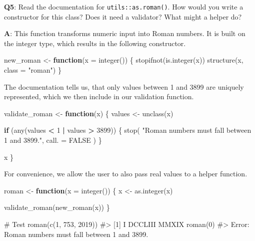 \documentclass[
]{krantz}
\makeatletter
\newenvironment{Shaded}{\begin{snugshade}}{\end{snugshade}}
\newcommand{\CommentTok}[1]{\textcolor[rgb]{0.56,0.35,0.01}{\textit{#1}}}
\newcommand{\ControlFlowTok}[1]{\textcolor[rgb]{0.13,0.29,0.53}{\textbf{#1}}}
\newcommand{\DataTypeTok}[1]{\textcolor[rgb]{0.13,0.29,0.53}{#1}}
\newcommand{\DecValTok}[1]{\textcolor[rgb]{0.00,0.00,0.81}{#1}}
\newcommand{\KeywordTok}[1]{\textcolor[rgb]{0.13,0.29,0.53}{\textbf{#1}}}
\newcommand{\NormalTok}[1]{#1}
\newcommand{\OperatorTok}[1]{\textcolor[rgb]{0.81,0.36,0.00}{\textbf{#1}}}
\newcommand{\OtherTok}[1]{\textcolor[rgb]{0.56,0.35,0.01}{#1}}
\newcommand{\StringTok}[1]{\textcolor[rgb]{0.31,0.60,0.02}{#1}}
\newenvironment{kframe}{%
\medskip{}
\setlength{\fboxsep}{.8em}
 \def\at@end@of@kframe{}%
 \ifinner\ifhmode%
  \def\at@end@of@kframe{\end{minipage}}%
  \begin{minipage}{\columnwidth}%
 \fi\fi%
 \def\FrameCommand##1{\hskip\@totalleftmargin \hskip-\fboxsep
 \colorbox{shadecolor}{##1}\hskip-\fboxsep
     \hskip-\linewidth \hskip-\@totalleftmargin \hskip\columnwidth}%
 \MakeFramed {\advance\hsize-\width
   \@totalleftmargin\z@ \linewidth\hsize
   \@setminipage}}%
 {\par\unskip\endMakeFramed%
 \at@end@of@kframe}
\renewenvironment{Shaded}{\begin{kframe}}{\end{kframe}}
\renewcommand{\KeywordTok} [1]{\textcolor[rgb]{0.00,0.44,0.13}{{#1}}}
\renewcommand{\DataTypeTok}[1]{\textcolor[rgb]{0.56,0.13,0.00}{{#1}}}
\renewcommand{\DecValTok}  [1]{\textcolor[rgb]{0.25,0.63,0.44}{{#1}}}
\renewcommand{\StringTok}  [1]{\textcolor[rgb]{0.25,0.44,0.63}{{#1}}}
\renewcommand{\CommentTok} [1]{\textcolor[rgb]{0.38,0.63,0.69}{{#1}}}
\renewcommand{\OtherTok}   [1]{\textcolor[rgb]{0.00,0.44,0.13}{{#1}}}
\renewcommand{\NormalTok}  [1]{{#1}}
\makeatother
\begin{document}
\textbf{{Q5}}: Read the documentation for \texttt{utils::as.roman()}. How would you write a constructor for this class? Does it need a validator? What might a helper do?

\textbf{{A}}: This function transforms numeric input into Roman numbers. It is built on the integer type, which results in the following constructor.

\begin{Shaded}
\begin{Highlighting}[]
\NormalTok{new_roman <-}\StringTok{ }\ControlFlowTok{function}\NormalTok{(}\DataTypeTok{x =} \KeywordTok{integer}\NormalTok{()) \{}
  \KeywordTok{stopifnot}\NormalTok{(}\KeywordTok{is.integer}\NormalTok{(x))}
  \KeywordTok{structure}\NormalTok{(x, }\DataTypeTok{class =} \StringTok{"roman"}\NormalTok{)}
\NormalTok{\}}
\end{Highlighting}
\end{Shaded}

The documentation tells us, that only values between 1 and 3899 are uniquely represented, which we then include in our validation function.

\begin{Shaded}
\begin{Highlighting}[]
\NormalTok{validate_roman <-}\StringTok{ }\ControlFlowTok{function}\NormalTok{(x) \{}
\NormalTok{  values <-}\StringTok{ }\KeywordTok{unclass}\NormalTok{(x)}
  
  \ControlFlowTok{if}\NormalTok{ (}\KeywordTok{any}\NormalTok{(values }\OperatorTok{<}\StringTok{ }\DecValTok{1} \OperatorTok{|}\StringTok{ }\NormalTok{values }\OperatorTok{>}\StringTok{ }\DecValTok{3899}\NormalTok{)) \{}
    \KeywordTok{stop}\NormalTok{(}
      \StringTok{"Roman numbers must fall between 1 and 3899."}\NormalTok{,}
      \DataTypeTok{call. =} \OtherTok{FALSE}
\NormalTok{    )}
\NormalTok{  \}}
  
\NormalTok{  x}
\NormalTok{\}}
\end{Highlighting}
\end{Shaded}

For convenience, we allow the user to also pass real values to a helper function.

\begin{Shaded}
\begin{Highlighting}[]
\NormalTok{roman <-}\StringTok{ }\ControlFlowTok{function}\NormalTok{(}\DataTypeTok{x =} \KeywordTok{integer}\NormalTok{()) \{}
\NormalTok{  x <-}\StringTok{ }\KeywordTok{as.integer}\NormalTok{(x)}
  
  \KeywordTok{validate_roman}\NormalTok{(}\KeywordTok{new_roman}\NormalTok{(x))}
\NormalTok{\}}

\CommentTok{# Test}
\KeywordTok{roman}\NormalTok{(}\KeywordTok{c}\NormalTok{(}\DecValTok{1}\NormalTok{, }\DecValTok{753}\NormalTok{, }\DecValTok{2019}\NormalTok{))}
\CommentTok{#> [1] I       DCCLIII MMXIX}
\KeywordTok{roman}\NormalTok{(}\DecValTok{0}\NormalTok{)}
\CommentTok{#> Error: Roman numbers must fall between 1 and 3899.}
\end{Highlighting}
\end{Shaded}
\end{document}
